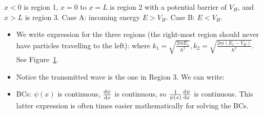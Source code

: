 \documentclass{school-22.101-notes}
\date{September 26, 2011}
\begin{document}
\maketitle




 \label{rectangular-barrier}
$x<0$ is region 1, $x=0$ to $x=L$ is region 2 with a potential barrier of $V_H$, and $x>L$ is region 3. Case A: incoming energy $E > V_H$. Case B: $E < V_H$. 

\begin{itemize}
\begin{figure}[ht]
    \centering
    \texttt{[image: images/qm/rectangular-caseA.png]}
    \caption{Rectangular Barrier Diagram, E$>$V}
    \label{rectangular-caseA}
\end{figure}
\item We write expression for the three regions (the right-most region should never have particles travelling to the left): 
where $k_1 =  \sqrt{\frac{2 m E_1}{\hbar^2}}, k_2 = \sqrt{\frac{2 m (E_1 - V_H)}{\hbar^2}}$. See Figure~\ref{rectangular-caseA}.


\item Notice the transmitted wave is the one in Region 3. We can write: 

\item BCs: $\psi(x)$ is continuous, $\frac{\mathrm{d}\psi}{\mathrm{d}x}$ is continuous, so $\frac{1}{\psi (x)} \frac{\mathrm{d}\psi}{\mathrm{d}x}$ is continuous. This latter expression is often times easier mathematically for solving the BCs. 

\end{itemize}
\end{document}
